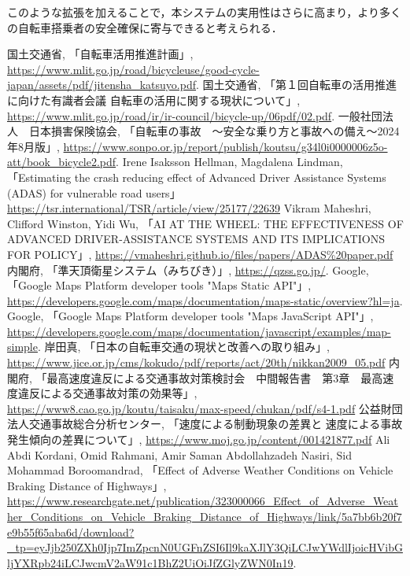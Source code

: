 \documentclass[uplatex,dvipdfmx]{jsarticle}
\begin{document}
このような拡張を加えることで，本システムの実用性はさらに高まり，より多くの自転車搭乗者の安全確保に寄与できると考えられる．

\begin{thebibliography}{16}
 国土交通省, 「自転車活用推進計画」, \url{https://www.mlit.go.jp/road/bicycleuse/good-cycle-japan/assets/pdf/jitensha_katsuyo.pdf}.
  国土交通省, 「第１回自転車の活用推進に向けた有識者会議 自転車の活用に関する現状について」, \url{https://www.mlit.go.jp/road/ir/ir-council/bicycle-up/06pdf/02.pdf}.
 一般社団法人　日本損害保険協会, 「自転車の事故　〜安全な乗り方と事故への備え〜2024年8月版」, \url{https://www.sonpo.or.jp/report/publish/koutsu/g34l0i0000006z5o-att/book_bicycle2.pdf}.
 Irene Isaksson Hellman, Magdalena Lindman, 「Estimating the crash reducing effect of Advanced Driver Assistance Systems (ADAS) for vulnerable road users」\url{https://tsr.international/TSR/article/view/25177/22639}
 Vikram Maheshri, Clifford Winston, Yidi Wu, 「AI AT THE WHEEL:
THE EFFECTIVENESS OF ADVANCED DRIVER-ASSISTANCE SYSTEMS AND ITS IMPLICATIONS FOR POLICY」, \url{https://vmaheshri.github.io/files/papers/ADAS%20paper.pdf}
 内閣府, 「準天頂衛星システム（みちびき）」, \url{https://qzss.go.jp/}.
 Google, 「Google Maps Platform developer tools "Maps Static API"」, \url{https://developers.google.com/maps/documentation/maps-static/overview?hl=ja}.
 Google, 「Google Maps Platform developer tools "Maps JavaScript API"」, \url{https://developers.google.com/maps/documentation/javascript/examples/map-simple}.
 岸田真, 「日本の自転車交通の現状と改善への取り組み」, \url{https://www.jice.or.jp/cms/kokudo/pdf/reports/act/20th/nikkan2009_05.pdf}
 内閣府, 「最高速度違反による交通事故対策検討会　中間報告書　第3章　最高速度違反による交通事故対策の効果等」, \url{https://www8.cao.go.jp/koutu/taisaku/max-speed/chukan/pdf/s4-1.pdf}
 公益財団法人交通事故総合分析センター, 「速度による制動現象の差異と
速度による事故発生傾向の差異について」, \url{https://www.moj.go.jp/content/001421877.pdf}
Ali Abdi Kordani, Omid Rahmani, Amir Saman Abdollahzadeh Nasiri, Sid Mohammad Boroomandrad, 「Effect of Adverse Weather Conditions on Vehicle Braking
Distance of Highways」, \url{https://www.researchgate.net/publication/323000066_Effect_of_Adverse_Weather_Conditions_on_Vehicle_Braking_Distance_of_Highways/link/5a7bb6b20f7e9b55f65aba6d/download?_tp=eyJjb250ZXh0Ijp7ImZpcnN0UGFnZSI6Il9kaXJlY3QiLCJwYWdlIjoicHVibGljYXRpb24iLCJwcmV2aW91c1BhZ2UiOiJfZGlyZWN0In19}.

\end{thebibliography}
\end{document}
